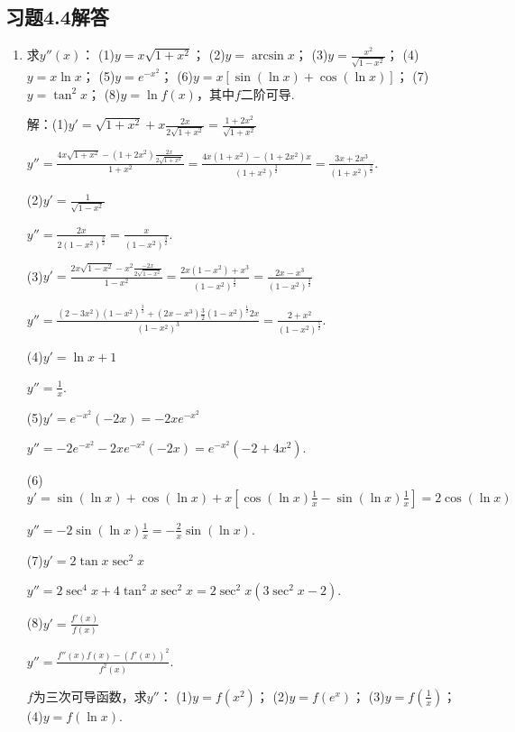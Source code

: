 \documentclass[12pt,UTF8]{ctexart}
\begin{document}
\subsection{习题4.4解答}
\begin{enumerate}
\item 求$y''(x)$：
\newline
(1)$y=x\sqrt{1+x^2}$；
\newline
(2)$y=\arcsin x$；
\newline
(3)$y=\frac{x^2}{\sqrt{1-x^2}}$；
\newline
(4)$y=x\ln x$；
\newline
(5)$y=e^{-x^2}$；
\newline
(6)$y=x[\sin(\ln x)+\cos(\ln x)]$；
\newline
(7)$y=\tan^2x$；
\newline
(8)$y=\ln f(x)$，其中$f$二阶可导.

解：(1)$y'=\sqrt{1+x^2}+x\frac{2x}{2\sqrt{1+x^2}}=\frac{1+2x^2}{\sqrt{1+x^2}}$

$y''=\frac{4x\sqrt{1+x^2}-(1+2x^2)\frac{2x}{2\sqrt{1+x^2}}}{1+x^2}=\frac{4x(1+x^2)-(1+2x^2)x}{(1+x^2)^{\frac32}}=\frac{3x+2x^3}{(1+x^2)^{\frac32}}$.

(2)$y'=\frac1{\sqrt{1-x^2}}$

$y''=\frac{2x}{2(1-x^2)^{\frac32}}=\frac{x}{(1-x^2)^{\frac32}}$.

(3)$y'=\frac{2x\sqrt{1-x^2}-x^2\frac{-2x}{2\sqrt{1-x^2}}}{1-x^2}=\frac{2x(1-x^2)+x^3}{(1-x^2)^\frac32}=\frac{2x-x^3}{(1-x^2)^\frac32}$

$y''=\frac{(2-3x^2)(1-x^2)^{\frac32}+(2x-x^3)\frac32(1-x^2)^{\frac12}2x}{(1-x^2)^3}=\frac{2+x^2}{(1-x^2)^{\frac52}}$.

(4)$y'=\ln x+1$

$y''=\frac1x$.

(5)$y'=e^{-x^2}(-2x)=-2xe^{-x^2}$

$y''=-2e^{-x^2}-2xe^{-x^2}(-2x)=e^{-x^2}(-2+4x^2)$.

(6)$y'=\sin(\ln x)+\cos(\ln x)+x[\cos(\ln x)\frac1x-\sin(\ln x)\frac1x]=2\cos(\ln x)$

$y''=-2\sin(\ln x)\frac1x=-\frac2x\sin(\ln x)$.

(7)$y'=2\tan x\sec^2x$

$y''=2\sec^4x+4\tan^2x\sec^2x=2\sec^2x(3\sec^2x-2)$.

(8)$y'=\frac{f'(x)}{f(x)}$

$y''=\frac{f''(x)f(x)-(f'(x))^2}{f^2(x)}$.

$f$为三次可导函数，求$y''$：
\newline
(1)$y=f(x^2)$；
\newline
(2)$y=f(e^x)$；
\newline
(3)$y=f(\frac1x)$；
\newline
(4)$y=f(\ln x)$.


\end{enumerate}
\end{document}
